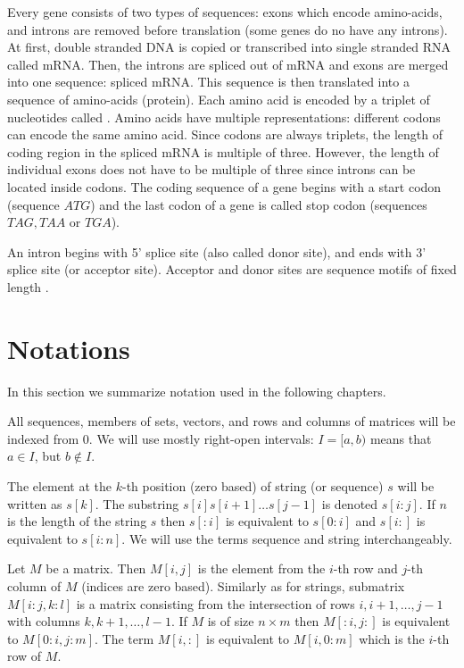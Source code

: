 Every gene consists of two types of
sequences: exons which encode amino-acids, and introns are removed
before translation (some genes do no have any introns). At first,
double stranded DNA is copied or transcribed into single stranded RNA called
mRNA. Then, the introns are spliced out of mRNA and exons are merged into one
sequence: spliced mRNA. This sequence is then translated into a sequence of
amino-acids (protein). Each amino acid is encoded by a triplet of nucleotides
called . Amino acids have multiple representations: different
codons can encode the same amino acid. Since codons are always triplets, the length
of coding region in the  spliced mRNA is multiple of three. However, the length
of individual exons does not
have to be multiple of three since introns can be located inside codons.  The
coding sequence of a gene begins with a start codon (sequence $ATG$) and the
last codon of a gene is called stop codon (sequences $TAG,TAA$ or $TGA$).

An intron begins with 5' splice site (also called donor site),  and ends with
3' splice site (or acceptor site).  Acceptor and donor sites are sequence motifs
of fixed length \cite{Pairagon2009,UnderstandingBioinformatics}.


\section{Notations}

In this section we summarize notation used in the following
chapters.

All sequences, members of sets, vectors, and rows and columns of matrices will be indexed from $0$. We will use mostly
right-open intervals: $I=[a,b)$ means that $a\in I$, but $b\notin I$. 

The element at the $k$-th position (zero based) of string (or sequence) $s$
will be written as $s[k]$. The substring $s[i]s[i+1]\dots s[j-1]$ 
is denoted $s[i:j]$.  If $n$
is the length of the string $s$ then $s[:i]$ is equivalent to $s[0:i]$ and $s[i:]$
is equivalent to $s[i:n]$.  We will use the terms sequence and string
interchangeably.

Let $M$ be a matrix. Then $M[i,j]$ is the element from the $i$-th row and
$j$-th column of $M$ (indices are zero based). Similarly as for strings,
submatrix $M[i:j,k:l]$ is a matrix consisting from the intersection of rows
$i,i+1,\dots, j-1$ with columns $k,k+1,\dots,l-1$. If $M$ is of
size $n\times m$ then $M[:i,j:]$ is equivalent to $M[0:i,j:m]$.  The term
$M[i,:]$ is equivalent to $M[i,0:m]$ which is the $i$-th row of $M$.
